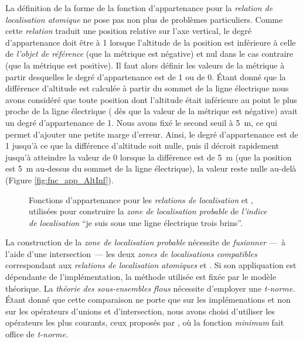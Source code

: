 La définition de la forme de la fonction d'appartenance pour la
\emph{relation de localisation atomique}
 ne pose
pas non plus de problèmes particuliers. Comme cette \emph{relation}
traduit une position relative sur l'axe vertical, le degré
d'appartenance doit être à 1 lorsque l'altitude de la position est
inférieure à celle de \emph{l'objet de référence} (\ie que la métrique
est négative) et nul dans le cas contraire (\ie que la métrique est
positive). Il faut alors définir les valeurs de la métrique à partir
desquelles le degré d'appartenance est de 1 ou de 0. Étant donné que
la différence d'altitude est calculée à partir du sommet de la ligne
électrique nous avons considéré que toute position dont l'altitude
était inférieure au point le plus proche de la ligne électrique (\ie
dès que la valeur de la métrique est négative) avait un degré
d'appartenance de 1. Nous avons fixé le second seuil à \SI{5}{\meter},
ce qui permet d'ajouter une petite marge d'erreur. Ainsi, le degré
d'appartenance est de 1 jusqu’à ce que la différence d'altitude soit
nulle, puis il décroit rapidement jusqu'à atteindre la valeur de 0
lorsque la différence est de \SI{5}{\meter} (\ie que la position est
\SI{5}{\meter} au-dessus du sommet de la ligne électrique), la valeur
reste nulle au-delà (Figure \ref{fig:fnc_app_AltInf}).

\begin{figure}
  \centering
  \subfloat{%
    
    \label{fig:fnc_app_Dist}
  }
  \hfill%
  \subfloat{%
    
    \label{fig:fnc_app_AltInf}
  }
  \caption{Fonctions d'appartenance pour les \emph{relations de
      localisation}
    \protect{}
    et
    \protect{},
    utilisées pour construire la \emph{zone de localisation probable}
    de \emph{l'indice de localisation} \enquote{je suis sous une ligne
      électrique trois brins}.}
  \label{fig:fnc_app_sousProche}
\end{figure}

La construction de la \emph{zone de localisation probable} nécessite
de \emph{fusionner} ---~à l'aide d'une intersection~--- les deux
\emph{zones de localisations compatibles} correspondant aux
\emph{relations de localisation atomiques}
 et
. Si
son appliquation est dépendante de l'implémentation, la méthode
utilisée est fixée par le modèle théorique. La \emph{théorie des
  sous-ensembles flous} nécessite d'employer une \emph{t-norme.} Étant
donné que cette comparaison ne porte que sur les implémenations et non
sur les opérateurs d'unions et d'intersection, nous avons choisi
d'utiliser les opérateurs les plus courants, ceux proposés par
\textcite{Zadeh1965}, où la fonction \emph{minimum} fait office de
\emph{t-norme.}

